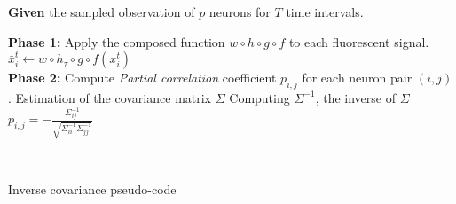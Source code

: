 \documentclass[wcp]{jmlr}
\begin{document}
\begin{algorithm}[ht]
\begin{algorithmic}

\STATE \textbf{Given} the sampled observation of $p$ neurons for $T$ time intervals.\\[2ex]


\STATE \vspace{1em} \textbf{Phase 1:} Apply the composed function $w \circ h \circ g \circ f$ to each fluorescent signal.
\STATE $\bar{x}^t_i  \leftarrow w \circ h_{\tau} \circ g \circ f (x^t_i)$
\ENDFOR\\[2ex]

\STATE \textbf{Phase 2:} Compute \textit{Partial correlation} coefficient $p_{i,j}$ for each neuron pair $(i,j)$.
\STATE Estimation of the covariance matrix $\Sigma$
\STATE Computing $\Sigma^{-1}$, the inverse of $\Sigma$
\STATE $p_{i,j} =
-\frac{\Sigma^{-1}_{ij}}{\sqrt{\Sigma^{-1}_{ii} \Sigma^{-1}_{jj}}}$

\ENDFOR\\[2ex]
\ENDFOR

\end{algorithmic}
\caption{Inverse covariance pseudo-code}
\label{alg:inverse-covariance-pseudocode}
\end{algorithm}












\newpage

\end{document}
